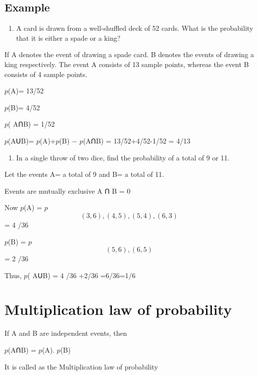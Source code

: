 \documentclass[
]{book}
\providecommand{\tightlist}{%
  \setlength{\itemsep}{0pt}\setlength{\parskip}{0pt}}
\begin{document}
\hypertarget{example-4}{%
\subsection*{Example}\label{example-4}}

\begin{enumerate}
\def\labelenumi{\arabic{enumi}.}
\tightlist
\item
  A card is drawn from a well-shuffled deck of 52 cards. What is the probability that it is either a spade or a king?
\end{enumerate}

If A denotes the event of drawing a \textquotesingle spade card\textquotesingle. B denotes the events of drawing a \textquotesingle king\textquotesingle{} respectively. The event A consists of 13 sample points, whereas the event B consists of 4 sample points.

\(p\)(A)= 13/52

\(p\)(B)= 4/52

\(p\)( AꓵB) = 1/52

\(p\)(AꓴB)= \(p\)(A)+\(p\)(B) − \(p\)(AꓵB) = 13/52+4/52-1/52 = 4/13

\begin{enumerate}
\def\labelenumi{\arabic{enumi}.}
\setcounter{enumi}{1}
\tightlist
\item
  In a single throw of two dice, find the probability of a total of 9 or 11.
\end{enumerate}

Let the events A= a total of 9 and B= a total of 11.

Events are mutually exclusive A ꓵ B = 0

Now \(p\)(A) = \(p\) \[(3, 6), (4, 5), (5, 4), (6, 3)\] = 4 /36

\(p\)(B) = \(p\)\[ (5, 6), (6, 5)\] = 2 /36

Thus, \(p\)( AꓴB) = 4 /36 +2/36 =6/36=1/6

\hypertarget{multiplication-law-of-probability}{%
\section{Multiplication law of probability}\label{multiplication-law-of-probability}}

If A and B are independent events, then

\(p\)(AꓵB) = \(p\)(A). \(p\)(B)

It is called as the Multiplication law of probability
\end{document}
